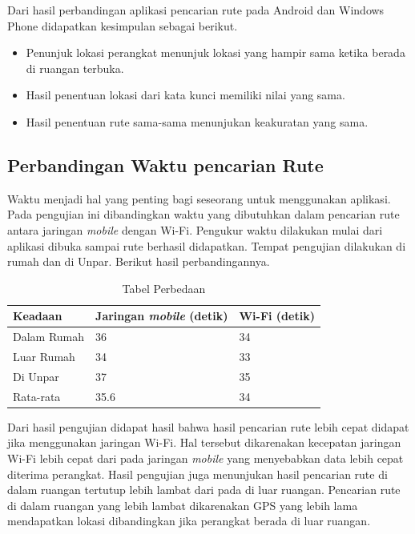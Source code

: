 	\hspace{0.5cm} Dari hasil perbandingan aplikasi pencarian rute pada Android dan Windows Phone didapatkan kesimpulan sebagai berikut.
	
	\begin{itemize}
		\item Penunjuk lokasi perangkat menunjuk lokasi yang hampir sama ketika berada di ruangan terbuka.
		\item Hasil penentuan lokasi dari kata kunci memiliki nilai yang sama.
		\item Hasil penentuan rute sama-sama menunjukan keakuratan yang sama.
	\end{itemize}
	
\subsection{Perbandingan Waktu pencarian Rute}
\label{lab:PerbandinganWaktu}
\hspace{0.5cm} Waktu menjadi hal yang penting bagi seseorang untuk menggunakan aplikasi. Pada pengujian ini dibandingkan waktu yang dibutuhkan dalam pencarian rute antara jaringan \textit{mobile} dengan Wi-Fi. Pengukur waktu dilakukan mulai dari aplikasi dibuka sampai rute berhasil didapatkan. Tempat pengujian dilakukan di rumah dan di Unpar. Berikut hasil perbandingannya.
   \begin{table}[h]
	\centering
		\begin{tabular}{|p{4cm}|p{4cm}|p{4cm}|}\hline
				Keadaan & Jaringan \textit{mobile} (detik) & Wi-Fi (detik) \\ \hline
				Dalam Rumah & 36 & 34\\ \hline
				Luar Rumah & 34 & 33\\ \hline
				Di Unpar & 37 & 35\\ \hline
				Rata-rata & 35.6 & 34\\ \hline
		\end{tabular}
	\caption{Tabel Perbedaan}
	\label{tab:TabelPerbandinganWifiSelular}
\end{table}

\hspace{0.5cm} Dari hasil pengujian didapat hasil bahwa hasil pencarian rute lebih cepat didapat jika menggunakan jaringan Wi-Fi. Hal tersebut dikarenakan kecepatan jaringan Wi-Fi lebih cepat dari pada jaringan \textit{mobile} yang menyebabkan data lebih cepat diterima perangkat. Hasil pengujian juga menunjukan hasil pencarian rute di dalam ruangan tertutup lebih lambat dari pada di luar ruangan. Pencarian rute di dalam ruangan yang lebih lambat dikarenakan GPS yang lebih lama mendapatkan lokasi dibandingkan jika perangkat berada di luar ruangan. 	
	
